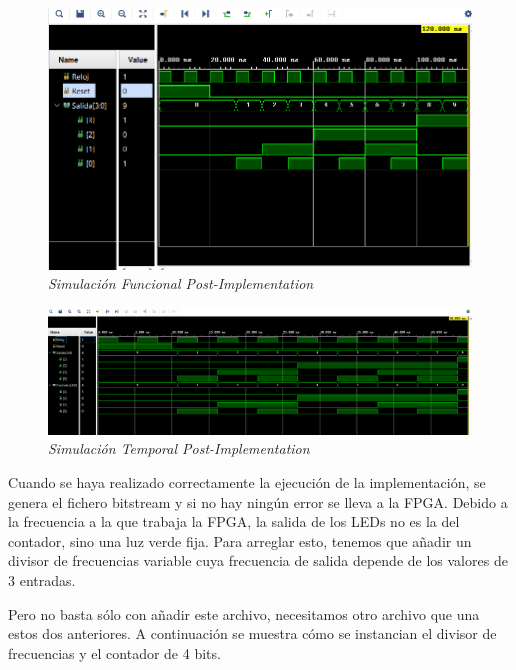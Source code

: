 \begin{figure}[H]
    \centering
    \includegraphics[width = 1\textwidth]{imagenes/simulacionfuncional2.png}
    \caption{\textit{Simulación Funcional Post-Implementation}}\label{sfps1}
\end{figure}

\begin{figure}[H]
    \centering
    \includegraphics[width = 1\textwidth]{imagenes/simulaciontemporal2.png}
    \caption{\textit{Simulación Temporal Post-Implementation}}\label{stps1}
\end{figure}

Cuando se haya realizado correctamente la ejecución de la implementación, se genera el fichero bitstream y si no hay ningún error se lleva a la FPGA. 
Debido a la frecuencia a la que trabaja la FPGA, la salida de los LEDs no es la del contador, sino una luz verde fija. Para arreglar esto, tenemos 
que añadir un divisor de frecuencias variable cuya frecuencia de salida depende de los valores de 3 entradas.

Pero no basta sólo con añadir este archivo, necesitamos otro archivo que una estos dos anteriores. A continuación se muestra cómo se instancian el 
divisor de frecuencias y el contador de 4 bits.

